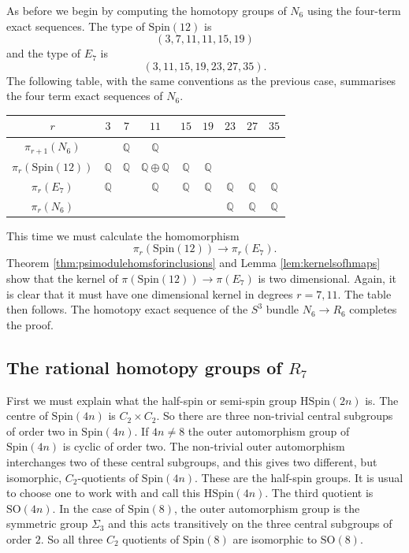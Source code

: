 \documentclass[twoside,a4paper,reqno,11pt]{amsart}
\newcommand{\Q}{\mathbb{Q}}
\newcommand{\Spin}{\mathrm{Spin}}
\newcommand{\HSpin}{\mathrm{HSpin}}
\newcommand{\SO}{\mathrm{SO}}
\begin{document}
As before we begin by computing the homotopy groups of $N_6$ using the four-term exact sequences.  The type of $\Spin(12)$ is
\[
(3, 7, 11, 11, 15, 19)
\]
and the type of $E_7$ is 
\[
(3, 11, 15, 19, 23, 27, 35).
\]
The following table, with the same conventions as the previous case, summarises the four term exact sequences of $N_6$.
\vspace{\baselineskip}
\begin{center}
\begin{tabular}{ | c | c | c | c | c | c | c | c | c | }
\hline
$r$  & $3$ & $7$ & $11$ & $15$ & $19$ & $23$ & $27$ & $35$  \\
\hline
$\pi_{r+1}(N_6)$ & & $\Q$ & $\Q$ &  & & &  &     \\
\hline
$\pi_{r}(\Spin(12))$ & $\Q$ & $\Q$ & $\Q\oplus\Q$ & $\Q$ & $\Q$ & & &    \\
\hline
$\pi_{r}(E_7)$ & $\Q$ & &$\Q$ &$\Q$ &$\Q$ & $\Q$ &$\Q$ & $\Q$  \\
\hline
$\pi_{r}(N_6)$ &  &  &  &   & & $\Q$ & $\Q$ &$\Q$  \\
\hline
\end{tabular}
\end{center}

\vspace{\baselineskip}
This time we must calculate the homomorphism
$$
\pi_r(\Spin(12)) \to \pi_r(E_7).
$$
Theorem \ref{thm:psimodulehomsforinclusions} and Lemma \ref{lem:kernelsofhmaps} show that the kernel of $\pi(\Spin(12)) \to \pi(E_7)$ is two dimensional. Again, it is clear that it must have one dimensional kernel in degrees $r = 7, 11$. The table then follows. The homotopy exact sequence of the $S^3$ bundle $N_6 \to R_6$ completes the proof. 


\subsection{The rational homotopy groups of $R_7$}
First we must explain what the half-spin or semi-spin group $\HSpin(2n)$ is.  The centre of $\Spin(4n)$ is $C_2 \times C_2$. So there are three non-trivial central subgroups of order two in $\Spin(4n)$.  If $4n \neq 8$ the outer automorphism group of $\Spin(4n)$ is cyclic of order two. The non-trivial outer automorphism interchanges two of these central subgroups, and this gives two different, but isomorphic, $C_2$-quotients of $\Spin(4n)$.  These are the half-spin groups.  It is usual to choose one to work with and call this $\HSpin(4n)$.  The third quotient is $\SO(4n)$.  In the case of $\Spin(8)$, the outer automorphism group is the symmetric group $\Sigma_3$ and this acts transitively on the three central subgroups of order $2$.  So all three $C_2$ quotients of $\Spin(8)$ are isomorphic to $\SO(8)$.
\end{document}
